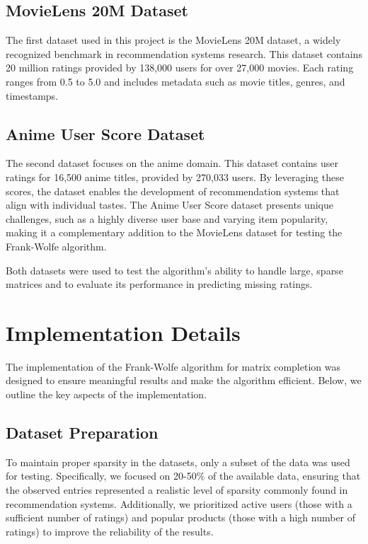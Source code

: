 \documentclass[a4paper, 11pt, reqno]{article} %
\begin{document}
\begin{multicols}{2}
\subsection{MovieLens 20M Dataset}
The first dataset\cite{10.1145/2827872} used in this project is the MovieLens 20M dataset, a widely recognized benchmark in recommendation systems research. This dataset contains 20 million ratings provided by 138,000 users for over 27,000 movies. Each rating ranges from 0.5 to 5.0 and includes metadata such as movie titles, genres, and timestamps.

\subsection{Anime User Score Dataset}
The second dataset\cite{animeDataset} focuses on the anime domain. This dataset contains user ratings for 16,500 anime titles, provided by 270,033 users. By leveraging these scores, the dataset enables the development of recommendation systems that align with individual tastes. The Anime User Score dataset presents unique challenges, such as a highly diverse user base and varying item popularity, making it a complementary addition to the MovieLens dataset for testing the Frank-Wolfe algorithm. 

Both datasets were used to test the algorithm's ability to handle large, sparse matrices and to evaluate its performance in predicting missing ratings. 

\section{Implementation Details}

The implementation of the Frank-Wolfe algorithm for matrix completion was designed to ensure meaningful results and make the algorithm efficient\cite{d8e5ac9d80b841129c2d1ff124cda213}. Below, we outline the key aspects of the implementation.

\subsection{Dataset Preparation}
To maintain proper sparsity in the datasets, only a subset of the data was used for testing. Specifically, we focused on 20-50\% of the available data, ensuring that the observed entries represented a realistic level of sparsity commonly found in recommendation systems. Additionally, we prioritized active users (those with a sufficient number of ratings) and popular products (those with a high number of ratings) to improve the reliability of the results.


\end{multicols}
\end{document}
